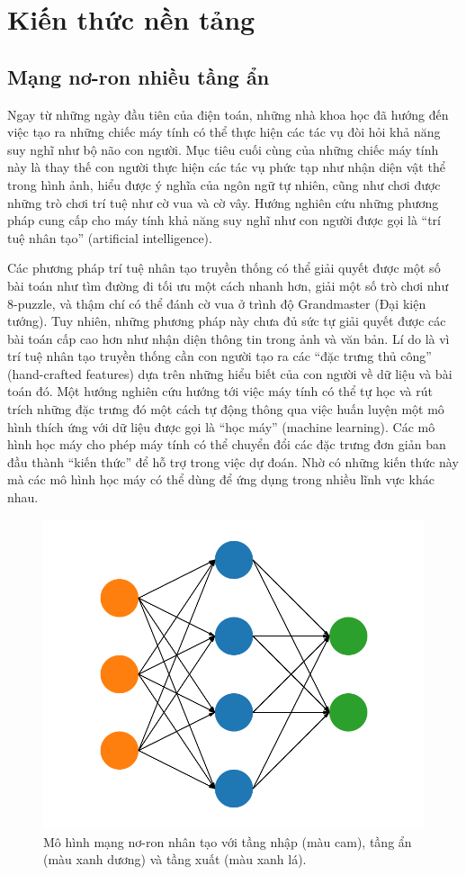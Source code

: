 \chapter{Kiến thức nền tảng}
\label{Chapter2}

\section{Mạng nơ-ron nhiều tầng ẩn}

Ngay từ những ngày đầu tiên của điện toán, những nhà khoa học đã hướng đến việc tạo ra những chiếc máy tính có thể thực hiện các tác vụ đòi hỏi khả năng suy nghĩ như bộ não con người. Mục tiêu cuối cùng của những chiếc máy tính này là thay thế con người thực hiện các tác vụ phức tạp như nhận diện vật thể trong hình ảnh, hiểu được ý nghĩa của ngôn ngữ tự nhiên, cũng như chơi được những trò chơi trí tuệ như cờ vua và cờ vây. Hướng nghiên cứu những phương pháp cung cấp cho máy tính khả năng suy nghĩ như con người được gọi là ``trí tuệ nhân tạo'' (artificial intelligence).

Các phương pháp trí tuệ nhân tạo truyền thống có thể giải quyết được một số bài toán như tìm đường đi tối ưu một cách nhanh hơn, giải một số trò chơi như 8-puzzle, và thậm chí có thể đánh cờ vua ở trình độ Grandmaster (Đại kiện tướng)\cite{campbell2001deepblue}. Tuy nhiên, những phương pháp này chưa đủ sức tự giải quyết được các bài toán cấp cao hơn như nhận diện thông tin trong ảnh và văn bản. Lí do là vì trí tuệ nhân tạo truyền thống cần con người tạo ra các ``đặc trưng thủ công'' (hand-crafted features) dựa trên những hiểu biết của con người về dữ liệu và bài toán đó. Một hướng nghiên cứu hướng tới việc máy tính có thể tự học và rút trích những đặc trưng đó một cách tự động thông qua việc huấn luyện một mô hình thích ứng với dữ liệu được gọi là ``học máy'' (machine learning). Các mô hình học máy cho phép máy tính có thể chuyển đổi các đặc trưng đơn giản ban đầu thành ``kiến thức'' để hỗ trợ trong việc dự đoán. Nhờ có những kiến thức này mà các mô hình học máy có thể dùng để ứng dụng trong nhiều lĩnh vực khác nhau.

\begin{figure}[htp]
\centering
\includegraphics[width=80 mm]{images/ann.png}
\caption{Mô hình mạng nơ-ron nhân tạo với tầng nhập (màu cam), tầng ẩn (màu xanh dương) và tầng xuất (màu xanh lá).}
\label{fig:ann}
\end{figure}

